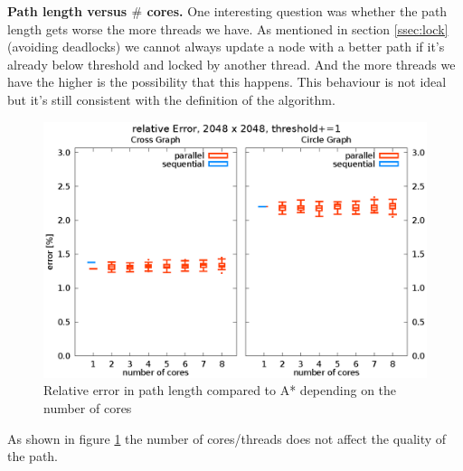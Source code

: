 \documentclass[letterpaper]{article}
\newcommand{\mypar}[1]{{\bf #1.}}
\begin{document}
\mypar{Path length versus $\#$ cores}
One interesting question was whether the path length gets worse the more threads we have. As mentioned in section \ref{ssec:lock} (avoiding deadlocks) we cannot always update a node with a better path if it's already below threshold and locked by another thread. And the more threads we have the higher is the possibility that this happens. This behaviour is not ideal but it's still consistent with the definition of the algorithm.
\begin{figure}[h]\centering
  \includegraphics[scale=0.558]{error_cores.eps}
  \caption{Relative error in path length compared to A* depending on the number of cores\label{fig:error_cores}}
\end{figure}
As shown in figure \ref{fig:error_cores} the number of cores/threads does not affect the quality of the path.
\end{document}
